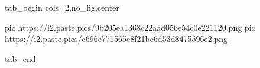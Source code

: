  
 
 
 
 

\ifcmt
  tab_begin cols=2,no_fig,center

     pic https://i2.paste.pics/9b205ea1368c22aad056e54c0e221120.png
		 pic https://i2.paste.pics/e696e771565e8f21be6d53d8475596e2.png

  tab_end
\fi
